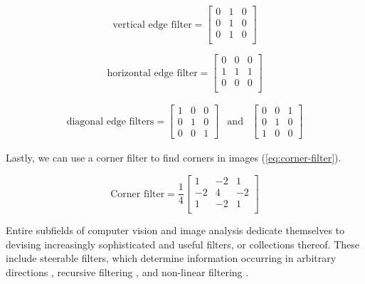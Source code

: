 \begin{equation}
    \text{vertical edge filter} = \begin{bmatrix}
            0 & 1 & 0 \\
            0 & 1 & 0 \\
            0 & 1 & 0 \\
    \end{bmatrix}
    \label{eq:vert-edge-filter}
\end{equation}

\begin{equation}
    \text{horizontal edge filter} =\begin{bmatrix}
        0 & 0 & 0 \\
        1 & 1 & 1 \\
        0 & 0 & 0 \\
    \end{bmatrix}
    \label{eq:horiz-edge-filter}
\end{equation}

\begin{equation}
    \begin{aligned}
        \text{diagonal edge filters} = \begin{bmatrix}
            1 & 0 & 0 \\
            0 & 1 & 0\\
            0 & 0 & 1
        \end{bmatrix}& \text{and} & 
        \begin{bmatrix}
            0 & 0 & 1 \\
            0 & 1 & 0\\
            1 & 0 & 0
        \end{bmatrix}
    \end{aligned}
    \label{eq:diag-edge-filter}
\end{equation}

Lastly, we can use a corner filter to find corners in images (\cref{eq:corner-filter}).

\begin{equation}
    \text{Corner filter} = \frac{1}{4}\begin{bmatrix}
        1 & -2 & 1 \\
        -2 & 4 & -2 \\
        1 & -2 & 1 \\
    \end{bmatrix}
    \label{eq:corner-filter}
\end{equation}

Entire subfields of computer vision and image analysis dedicate themselves to devising increasingly sophisticated and useful filters, or collections thereof.
These include steerable filters, which determine information occurring in arbitrary directions \cite{freemanSteerableFiltersLocal1992}, recursive filtering \cite{nielsenRegularizationScalespaceEdge1996}, and non-linear filtering \cite{tomasiBilateralFilteringGray1998}.

